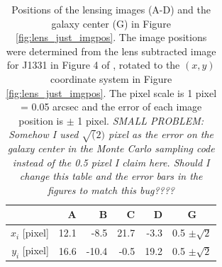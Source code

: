 \begin{table}
\centering
\begin{minipage}{70mm}
\begin{tabular}{r|rrrr|c}
\hline
  & A & B & C & D & G\\\hline
$x_i$ [pixel] & 12.1 & -8.5 & 21.7 & -3.3 & 0.5 $\pm \sqrt{2}$ \\
$y_i$ [pixel] & 16.6 & -10.4 & -0.5 & 19.2 & 0.5 $\pm \sqrt{2}$ \\
\hline
\end{tabular}
\caption{Positions of the lensing images (A-D) and the galaxy center (G) in Figure \ref{fig:lens_just_imgpos}. The image positions were determined from the lens subtracted image for J1331 in Figure 4 of \citet{SWELLSIII}, rotated to the $(x,y)$ coordinate system in Figure \ref{fig:lens_just_imgpos}. The pixel scale is 1 pixel = 0.05 arcsec and the error of each image position is $\pm$ 1 pixel. \textit{SMALL PROBLEM: Somehow I used $\sqrt(2)$ pixel as the error on the galaxy center in the Monte Carlo sampling code instead of the 0.5 pixel I claim here. Should I change this table and the error bars in the figures to match this bug????}}
\label{tab:lenspos}
\end{minipage}
\end{table}


